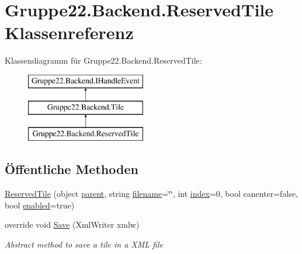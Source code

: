 \hypertarget{class_gruppe22_1_1_backend_1_1_reserved_tile}{\section{Gruppe22.\-Backend.\-Reserved\-Tile Klassenreferenz}
\label{class_gruppe22_1_1_backend_1_1_reserved_tile}
}
Klassendiagramm für Gruppe22.\-Backend.\-Reserved\-Tile\-:\begin{figure}[H]
\begin{center}
\leavevmode
\includegraphics[height=3.000000cm]{class_gruppe22_1_1_backend_1_1_reserved_tile}
\end{center}
\end{figure}
\subsection*{Öffentliche Methoden}
\begin{DoxyCompactItemize}
\item 
\hyperlink{class_gruppe22_1_1_backend_1_1_reserved_tile_a6b513ca0ef7f2ba3dab5465d05da3a31}{Reserved\-Tile} (object \hyperlink{class_gruppe22_1_1_backend_1_1_tile_abc12933c70eb3a2ebbb2fde9f45c2632}{parent}, string \hyperlink{class_gruppe22_1_1_backend_1_1_reserved_tile_a0b9d3bb08fee1ff6f97fc261f11ad8e2}{filename}=\char`\"{}\char`\"{}, int \hyperlink{class_gruppe22_1_1_backend_1_1_reserved_tile_a2f29d3692af2bcd57de9c4e258412d5c}{index}=0, bool canenter=false, bool \hyperlink{class_gruppe22_1_1_backend_1_1_reserved_tile_a2335635e0d117d2ddce9490a21b14639}{enabled}=true)
\item 
override void \hyperlink{class_gruppe22_1_1_backend_1_1_reserved_tile_a394fda5eebd1e5c853c904979bbe04ea}{Save} (Xml\-Writer xmlw)
\begin{DoxyCompactList}\small\item\em Abstract method to save a tile in a X\-M\-L file \end{DoxyCompactList}\end{DoxyCompactItemize}
